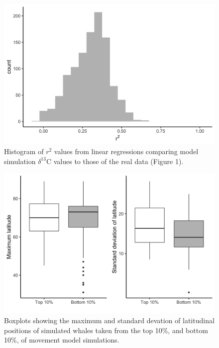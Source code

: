 \documentclass[a4paper,10pt]{article}
\begin{document}
  \begin{figure}[!htbp]
    \centering
      \includegraphics[width=\linewidth]{figures/Figure-S6-r2.png}
      \caption{Histogram of $r^2$ values from linear regressions comparing model simulation $\delta^{13}$C values to those of the real data (Figure 1).} %
      \label{figs6}
  \end{figure}

    \begin{figure}[!htbp]
    \centering
      \includegraphics[width=\linewidth]{figures/Figure-S7-boxplots.png}
      \caption{Boxplots showing the maximum and standard devation of latitudinal positions of simulated whales taken from the top 10\%, and bottom 10\%, of movement model simulations.} 
      \label{figs7}
  \end{figure}
\end{document}
